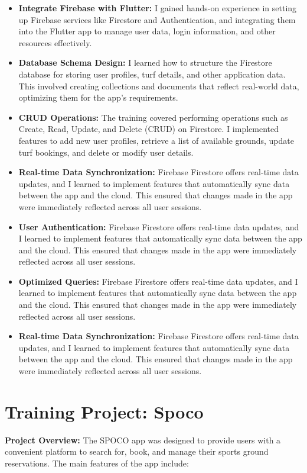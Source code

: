 \documentclass[12pt,a4paper]{report}
\begin{document}
\begin{itemize}
    \item \textbf{Integrate Firebase with Flutter:} I gained hands-on experience in setting up Firebase services like Firestore and Authentication, and integrating them into the Flutter app to manage user data, login information, and other resources effectively.
    \item \textbf{Database Schema Design:}  I learned how to structure the Firestore database for storing user profiles, turf details, and other application data. This involved creating collections and documents that reflect real-world data, optimizing them for the app's requirements.
    \item \textbf{CRUD Operations:}  The training covered performing operations such as Create, Read, Update, and Delete (CRUD) on Firestore. I implemented features to add new user profiles, retrieve a list of available grounds, update turf bookings, and delete or modify user details.
    \item \textbf{ Real-time Data Synchronization:}  Firebase Firestore offers real-time data updates, and I learned to implement features that automatically sync data between the app and the cloud. This ensured that changes made in the app were immediately reflected across all user sessions.
   \item \textbf{ User Authentication:}  Firebase Firestore offers real-time data updates, and I learned to implement features that automatically sync data between the app and the cloud. This ensured that changes made in the app were immediately reflected across all user sessions.
   \item \textbf{  Optimized Queries:}  Firebase Firestore offers real-time data updates, and I learned to implement features that automatically sync data between the app and the cloud. This ensured that changes made in the app were immediately reflected across all user sessions.
   \item \textbf{ Real-time Data Synchronization:}  Firebase Firestore offers real-time data updates, and I learned to implement features that automatically sync data between the app and the cloud. This ensured that changes made in the app were immediately reflected across all user sessions.
\end{itemize}


\section{Training Project: Spoco}
\textbf{Project Overview:}
The SPOCO app was designed to provide users with a convenient platform to search for, book, and manage their sports ground reservations. The main features of the app include:
\end{document}
